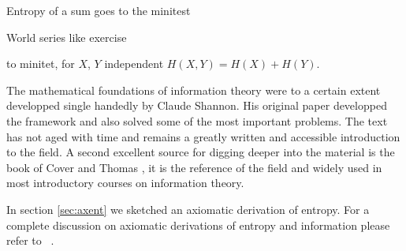 \begin{exercise}
Entropy of a sum goes to the minitest
\end{exercise}
\begin{exercise}
World series like exercise
\end{exercise}
\begin{exercise}
to minitet, for $X$, $Y$ independent $H(X,Y)=H(X)+H(Y)$.
\end{exercise}
The mathematical foundations of information theory were to a certain extent developped single handedly by Claude Shannon. His original paper \cite{Shannon_48} developped the framework and also solved some of the most important problems. The text has not aged with time and remains a greatly written and accessible introduction to the field. A second excellent source for digging deeper into the material is the book of Cover and Thomas \cite{Cover_91}, it is the reference of the field and widely used in most introductory courses on information theory. 

In section \ref{sec:axent} we sketched an axiomatic derivation of entropy. For a complete discussion on axiomatic derivations of entropy and information please refer to~ \cite{Aczel_74,Aczel_75,Csiszar_08,Feinstein_58}. 
